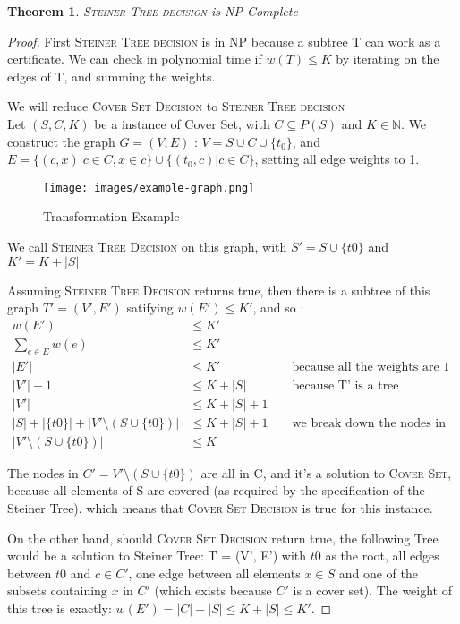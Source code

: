 \documentclass{article}
\newcommand{\N}{\mathbb{N}}
\newtheorem{thm}{Theorem}
\begin{document}
\begin{thm}
    \textsc{Steiner Tree decision} is NP-Complete 
\end{thm}
\begin{proof}
    First \textsc{Steiner Tree decision} is in NP because a subtree T can work as a certificate. 
    We can check in polynomial time if $w(T) \leq K$ by iterating on the edges of T, and summing the weights.
    
    We will reduce \textsc{Cover Set Decision} to \textsc{Steiner Tree decision}\\
    Let $(S,C,K)$ be a instance of Cover Set, with $C \subseteq P(S)$ and $K \in \N$.
    We construct the graph $G = (V, E)$ : $V=S \cup C \cup \{t_0\}$, and \\ $E = \{(c, x) | c \in C , x \in c\} \cup \{(t_0, c) | c \in C \}$, setting all edge weights to 1.\\
    \begin{figure}[h!]
        \centering
        \texttt{[image: images/example-graph.png]}
        \caption{Transformation Example}
        \label{fig:enter-label}
    \end{figure}
    
    We call \textsc{Steiner Tree Decision} on this graph, with $S'=S\cup \{t0\}$ and $K'=K + |S|$
    
    Assuming \textsc{Steiner Tree Decision} returns true, then there is a subtree of this graph $T'=(V',E')$ satifying $w(E') \leq K'$, and so :
    \begin{align*}
        w(E') &\leq K'  \\
        \sum\limits_{e\in E} w(e) &\leq K' \\
        |E'| &\leq K' && \text{      because all the weights are 1}\\
        |V'| - 1 &\leq K + |S| && \text{      because T' is a tree}\\
        |V'| &\leq K + |S| + 1\\
        |S| + |\{t0\}| + |V'\setminus (S \cup \{t0\})| &\leq K + |S| + 1 && \text{     we break down the nodes in T'}\\
        |V'\setminus (S \cup \{t0\})| &\leq K
    \end{align*}
    
    The nodes in $C'= V'\setminus (S \cup \{t0\})$ are all in C, and it's a solution to \textsc{Cover Set},
    because all elements of S are covered (as required by the specification of the Steiner Tree). which means that \textsc{Cover Set Decision} is true for this instance.

    On the other hand, should \textsc{Cover Set Decision} return true, the following Tree would be a solution to {Steiner Tree}: 
    T = (V', E') with $t0$ as the root, all edges between $t0$ and $c \in C'$, one edge between all elements $x \in S$ and one of the subsets containing $x$ in $C'$ (which exists because $C'$ is a cover set). The weight of this tree is exactly: $w(E') = |C| +|S| \leq K + |S| \leq K'$.
\end{proof}
\end{document}
